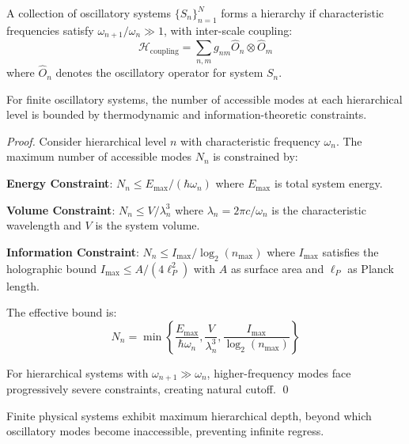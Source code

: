 \begin{definition}
A collection of oscillatory systems $\{S_n\}_{n=1}^{N}$ forms a hierarchy if characteristic frequencies satisfy $\omega_{n+1}/\omega_n \gg 1$, with inter-scale coupling:
$$\mathcal{H}_{\text{coupling}} = \sum_{n,m} g_{nm} \hat{O}_n \otimes \hat{O}_m$$
where $\hat{O}_n$ denotes the oscillatory operator for system $S_n$.
\end{definition}

\begin{theorem}
For finite oscillatory systems, the number of accessible modes at each hierarchical level is bounded by thermodynamic and information-theoretic constraints.
\end{theorem}

\begin{proof}
Consider hierarchical level $n$ with characteristic frequency $\omega_n$. The maximum number of accessible modes $N_n$ is constrained by:

\textbf{Energy Constraint}: $N_n \leq E_{\text{max}}/(\hbar\omega_n)$ where $E_{\text{max}}$ is total system energy.

\textbf{Volume Constraint}: $N_n \leq V/\lambda_n^3$ where $\lambda_n = 2\pi c/\omega_n$ is the characteristic wavelength and $V$ is the system volume.

\textbf{Information Constraint}: $N_n \leq I_{\text{max}}/\log_2(n_{\text{max}})$ where $I_{\text{max}}$ satisfies the holographic bound $I_{\text{max}} \leq A/(4\ell_P^2)$ with $A$ as surface area and $\ell_P$ as Planck length.

The effective bound is:
$$N_n = \min\left\{\frac{E_{\text{max}}}{\hbar\omega_n}, \frac{V}{\lambda_n^3}, \frac{I_{\text{max}}}{\log_2(n_{\text{max}})}\right\}$$

For hierarchical systems with $\omega_{n+1} \gg \omega_n$, higher-frequency modes face progressively severe constraints, creating natural cutoff. \qed
\end{proof}

\begin{corollary}
Finite physical systems exhibit maximum hierarchical depth, beyond which oscillatory modes become inaccessible, preventing infinite regress.
\end{corollary}

